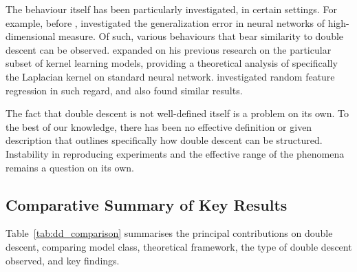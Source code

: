 \documentclass[
  journal=largetwo,
  simfonts=false,
  year=2025,
  volume=37,
]{cup-journal}
\begin{document}
The behaviour itself has been particularly investigated, in certain settings. For example, before \cite{belkin_reconciling_2019}, \cite{advani2017highdimensionaldynamicsgeneralizationerror} investigated the generalization error in neural networks of high-dimensional measure. Of such, various behaviours that bear similarity to double descent can be observed. \cite{belkin2018understanddeeplearningneed} expanded on his previous research on the particular subset of kernel learning models, providing a theoretical analysis of specifically the Laplacian kernel on standard neural network. \cite{mei2020generalizationerrorrandomfeatures} investigated random feature regression in such regard, and also found similar results. 

The fact that double descent is not well-defined itself is a problem on its own. To the best of our knowledge, there has been no effective definition or given description that outlines specifically how double descent can be structured. Instability in reproducing experiments and the effective range of the phenomena remains a question on its own. 

\subsection{Comparative Summary of Key Results}

Table~\ref{tab:dd_comparison} summarises the principal contributions on double descent, comparing model class, theoretical framework, the type of double descent observed, and key findings.
\end{document}

